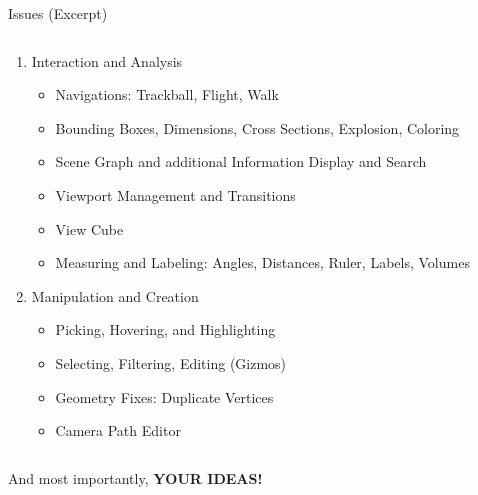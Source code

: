\begin{frame}{Issues (Excerpt)}
\begin{columns}[t]
\begin{column}{0.5\textwidth}
\begin{enumerate}
				\pause
				\item Interaction and Analysis
					\begin{itemize}\scriptsize
						\item Navigations: Trackball, Flight, Walk %
						\item Bounding Boxes, Dimensions, Cross Sections, Explosion, Coloring
						\item Scene Graph and additional Information Display and Search
						\item Viewport Management and Transitions
						\item View Cube
						\item Measuring and Labeling: Angles, Distances, Ruler, Labels, Volumes
					\end{itemize}
				
				\pause
				\item Manipulation and Creation
					\begin{itemize}\scriptsize
						\item Picking, Hovering, and Highlighting
						\item Selecting, Filtering, Editing (Gizmos) %
						\item Geometry Fixes: Duplicate Vertices %
						\item Camera Path Editor
					\end{itemize}
			
			\end{enumerate}
	
		\end{column}
	\end{columns}
	\bigskip\bigskip

	\pause
	\large And most importantly, \textbf{YOUR IDEAS!}
	\bigskip

\end{frame}


